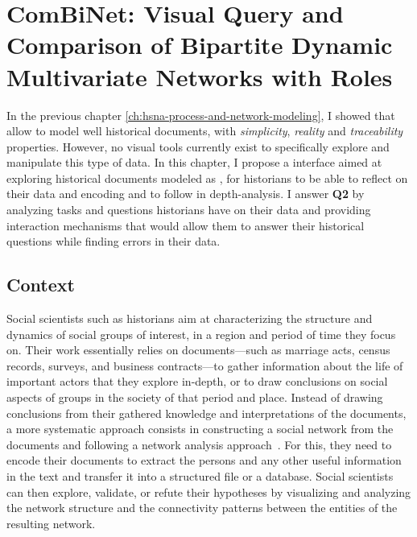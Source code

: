\chapter{ComBiNet: Visual Query and Comparison of Bipartite Dynamic Multivariate Networks with Roles}\label{ch:combinet}
\minitoc

\newcommand{\combinet}{ComBiNet\xspace}

In the previous chapter \autoref{ch:hsna-process-and-network-modeling}, I showed that \modelplural allow to model well historical documents, with \emph{simplicity}, \emph{reality} and \emph{traceability} properties.
However, no visual tools currently exist to specifically explore and manipulate this type of data.
In this chapter, I propose a \va interface aimed at exploring historical documents modeled as \modelplural, for historians to be able to reflect on their data and encoding and to follow in depth-analysis.
I answer \textbf{Q2} by analyzing tasks and questions historians have on their data and providing interaction mechanisms that would allow them to answer their historical questions while finding errors in their data.



\section{Context}

Social scientists such as historians aim at characterizing the structure and dynamics of social groups of interest, in a region and period of time they focus on\cite{tilly1984retrieving}.
Their work essentially relies on documents---such as marriage acts, census records, surveys, and business contracts---to gather information about the life of important actors that they explore in-depth, or to draw conclusions on social aspects of groups in the society of that period and place.
Instead of drawing conclusions from their gathered knowledge and interpretations of the documents, a more systematic approach consists in constructing a social network from the documents and following a network analysis approach~\cite{wetherellHistoricalSocialNetwork1998}.
For this, they need to encode their documents to extract the persons and any other useful information in the text and transfer it into a structured file or a database.
Social scientists can then explore, validate, or refute their hypotheses by visualizing and analyzing the network structure and the connectivity patterns between the entities of the resulting network.

